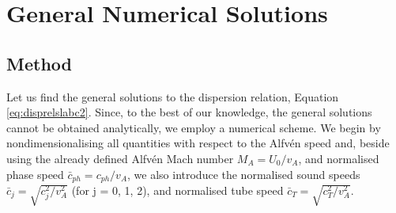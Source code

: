 \documentclass[12pt]{ociamthesis}
\begin{document}




\section{General Numerical Solutions}
\label{sec:numerics}



\subsection{Method}
\label{subsec:nummethod}

Let us find the general solutions to the dispersion relation, Equation \eqref{eq:disprelslabc2}.
Since, to the best of our knowledge, the general solutions cannot be obtained analytically, we employ a numerical scheme.
We begin by nondimensionalising all quantities with respect to the Alfv\'en speed and, beside using the already defined Alfv\'en Mach number $M_A = U_0/v_A$, and normalised phase speed $\bar c_{ph} = c_{ph} / v_A$, we also introduce the normalised sound speeds $\bar c_j = \sqrt{ c_j^2 / v_A^2 }$ (for j = 0, 1, 2), and normalised tube speed $\bar c_T = \sqrt{ c_T^2 / v_A^2 }$.
\end{document}
